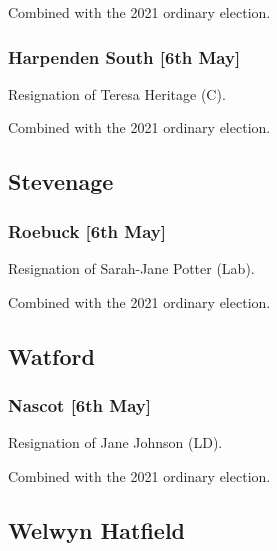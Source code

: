 \documentclass[a4paper,openany]{book}
\begin{document}
\begin{resultsiii}
Combined with the 2021 ordinary election.

\subsubsection*{Harpenden South \hspace*{\fill}\nolinebreak[1]%
	\enspace\hspace*{\fill}
	[6th May]}


Resignation of Teresa Heritage (C).

Combined with the 2021 ordinary election.

\subsection*{Stevenage}

\subsubsection*{Roebuck \hspace*{\fill}\nolinebreak[1]%
	\enspace\hspace*{\fill}
	[6th May]}


Resignation of Sarah-Jane Potter (Lab).

Combined with the 2021 ordinary election.

\subsection*{Watford}

\subsubsection*{Nascot \hspace*{\fill}\nolinebreak[1]%
	\enspace\hspace*{\fill}
	[6th May]}


Resignation of Jane Johnson (LD).

Combined with the 2021 ordinary election.

\subsection*{Welwyn Hatfield}


\end{resultsiii}
\end{document}
